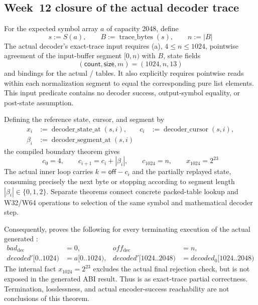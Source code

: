 \subsection{Week~12 closure of the actual decoder trace}

For the expected symbol array \(a\) of capacity 2048, define
\[
  s:=S(a),\qquad B:=\operatorname{trace\_bytes}(s),\qquad n:=|B|
\]
The actual decoder's exact-trace input requires
(a), \(4\le n\le1024\), pointwise
agreement of the input-buffer segment \([0,n)\) with \(B\), state fields
\[
  (\mathsf{count},\mathsf{size},m)=(1024,n,13)
\]
and bindings for the actual /
tables. It also explicitly requires pointwise reads within each normalization
segment to equal the corresponding pure list elements. This input predicate
contains no decoder success, output-symbol equality, or post-state assumption.

Defining the reference state, cursor, and segment by
\[
\begin{aligned}
  x_i&:=\operatorname{decoder\_state\_at}(s,i),&
  c_i&:=\operatorname{decoder\_cursor}(s,i),\\
  \beta_i&:=\operatorname{decoder\_segment\_at}(s,i)
\end{aligned}
\]
the compiled boundary theorem gives
\[
  c_0=4,\qquad c_{i+1}=c_i+|\beta_i|,\qquad
  c_{1024}=n,\qquad x_{1024}=2^{23}
\]
The actual inner loop carries \(k=\mathsf{off}-c_i\) and the partially replayed
state, consuming precisely the next byte or stopping according to segment
length \(|\beta_i|\in\{0,1,2\}\). Separate theorems connect concrete packed-table
lookup and W32/W64 operations to selection of the same symbol and mathematical
decoder step.

Consequently,  proves the
following for every terminating execution of the actual generated
:
\[
\begin{aligned}
  bad_{\mathrm{dec}}&=0,&
  off_{\mathrm{dec}}&=n,\\
  decoded'[0..1024)&=a[0..1024),&
  decoded'[1024..2048)&=decoded_0[1024..2048)
\end{aligned}
\]
The internal fact \(x_{1024}=2^{23}\) excludes the actual final rejection
check, but is not exposed in the generated ABI result. Thus
 is \statusproved as exact-trace partial
correctness. Termination, losslessness, and actual encoder-success reachability
are not conclusions of this theorem.

